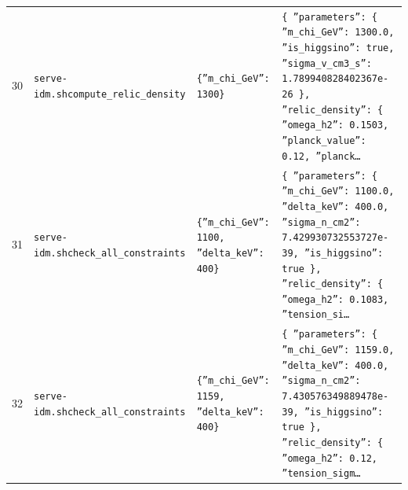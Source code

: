 \documentclass[11pt,a4paper]{article}
\begin{document}
\begin{longtable}{@{}p{}p{}p{}p{}@{}}
30 & \texttt{serve-idm.sh}\newline\texttt{compute\_\allowbreak{}relic\_\allowbreak{}density} & \texttt{\{''m\_\allowbreak{}chi\_\allowbreak{}GeV'':\allowbreak{} 1300\}\allowbreak{}} & \texttt{\{   ''parameters'':\allowbreak{} \{     ''m\_\allowbreak{}chi\_\allowbreak{}GeV'':\allowbreak{} 1300.0,\allowbreak{}     ''is\_\allowbreak{}higgsino'':\allowbreak{} true,\allowbreak{}     ''sigma\_\allowbreak{}v\_\allowbreak{}cm3\_\allowbreak{}s'':\allowbreak{} 1.789940828402367e-26   \}\allowbreak{},\allowbreak{}   ''relic\_\allowbreak{}density'':\allowbreak{} \{     ''omega\_\allowbreak{}h2'':\allowbreak{} 0.1503,\allowbreak{}     ''planck\_\allowbreak{}value'':\allowbreak{} 0.12,\allowbreak{}     ''planck\ldots{}\allowbreak{}} \\
31 & \texttt{serve-idm.sh}\newline\texttt{check\_\allowbreak{}all\_\allowbreak{}constraints} & \texttt{\{''m\_\allowbreak{}chi\_\allowbreak{}GeV'':\allowbreak{} 1100,\allowbreak{} ''delta\_\allowbreak{}keV'':\allowbreak{} 400\}\allowbreak{}} & \texttt{\{   ''parameters'':\allowbreak{} \{     ''m\_\allowbreak{}chi\_\allowbreak{}GeV'':\allowbreak{} 1100.0,\allowbreak{}     ''delta\_\allowbreak{}keV'':\allowbreak{} 400.0,\allowbreak{}     ''sigma\_\allowbreak{}n\_\allowbreak{}cm2'':\allowbreak{} 7.429930732553727e-39,\allowbreak{}     ''is\_\allowbreak{}higgsino'':\allowbreak{} true   \}\allowbreak{},\allowbreak{}   ''relic\_\allowbreak{}density'':\allowbreak{} \{     ''omega\_\allowbreak{}h2'':\allowbreak{} 0.1083,\allowbreak{}     ''tension\_\allowbreak{}si\ldots{}\allowbreak{}} \\
32 & \texttt{serve-idm.sh}\newline\texttt{check\_\allowbreak{}all\_\allowbreak{}constraints} & \texttt{\{''m\_\allowbreak{}chi\_\allowbreak{}GeV'':\allowbreak{} 1159,\allowbreak{} ''delta\_\allowbreak{}keV'':\allowbreak{} 400\}\allowbreak{}} & \texttt{\{   ''parameters'':\allowbreak{} \{     ''m\_\allowbreak{}chi\_\allowbreak{}GeV'':\allowbreak{} 1159.0,\allowbreak{}     ''delta\_\allowbreak{}keV'':\allowbreak{} 400.0,\allowbreak{}     ''sigma\_\allowbreak{}n\_\allowbreak{}cm2'':\allowbreak{} 7.430576349889478e-39,\allowbreak{}     ''is\_\allowbreak{}higgsino'':\allowbreak{} true   \}\allowbreak{},\allowbreak{}   ''relic\_\allowbreak{}density'':\allowbreak{} \{     ''omega\_\allowbreak{}h2'':\allowbreak{} 0.12,\allowbreak{}     ''tension\_\allowbreak{}sigm\ldots{}\allowbreak{}} \\

\end{longtable}
\end{document}
